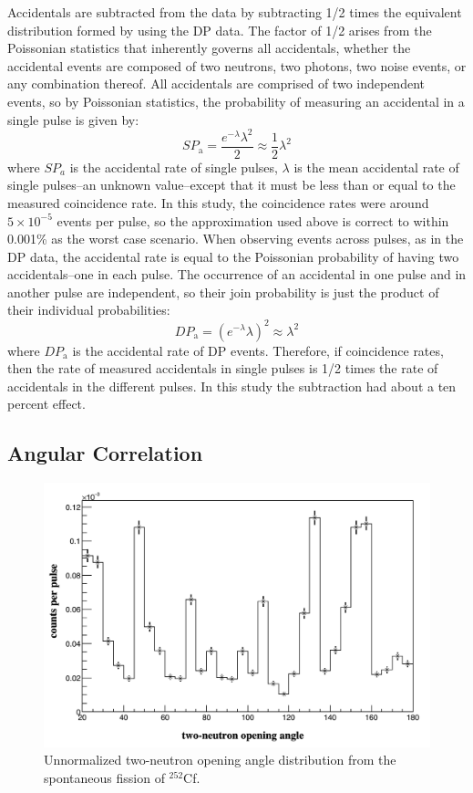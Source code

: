 Accidentals are subtracted from the data by subtracting 1/2 times the equivalent distribution formed by using the DP data. The factor of 1/2 arises from the Poissonian statistics that inherently governs all accidentals, whether the accidental events are composed of two neutrons, two photons, two noise events, or any combination thereof. All accidentals are comprised of two independent events, so by Poissonian statistics, the probability of measuring an accidental in a single pulse is given by:
\begin{displaymath}
SP_{\text{a}} = \frac{e^{-\lambda}\lambda^2}{2} \approx \frac{1}{2}\lambda^{2}
\end{displaymath}
where $SP_{a}$ is the accidental rate of single pulses, $\lambda$ is the mean accidental rate of single pulses–an unknown value–except that it must be less than or equal to the measured coincidence rate. In this study, the coincidence rates were around $5\times10^{-5}$ events per pulse, so the approximation used above is correct to within 0.001\% as the worst case scenario. When observing events across pulses, as in the DP data, the accidental rate is equal to the Poissonian probability of having two accidentals--one in each pulse. The occurrence of an accidental in one pulse and in another pulse are independent, so their join probability is just the product of their individual probabilities:
\begin{displaymath}
DP_{\text{a}} = (e^{-\lambda}\lambda)^{2}\approx \lambda^{2} 
\end{displaymath}
where $DP_{\text{a}}$ is the accidental rate of DP events. Therefore, if coincidence rates, then the rate of measured accidentals in single pulses is 1/2 times the rate of accidentals in the different pulses. In this study the subtraction had about a ten percent effect.  




\subsection{Angular Correlation}
\begin{figure}
    \centering
    \includegraphics[width  = \textwidth ]{Content/Methods/2N_Corr_OpeningAngleCf252.png}
    \caption{Unnormalized two-neutron opening angle distribution from the spontaneous fission of $^{252}$Cf.}
    \label{fig:OpeningAngleAcceptance}
\end{figure}